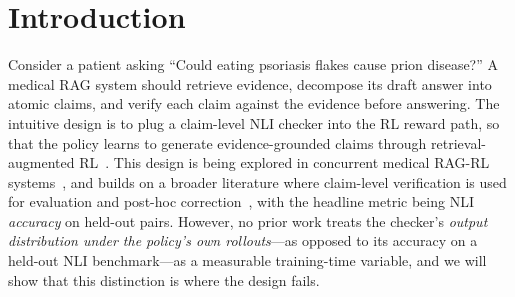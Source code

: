 \documentclass[11pt]{article}
\begin{document}
\section{Introduction}
\label{sec:intro}

Consider a patient asking ``Could eating psoriasis 
flakes cause prion disease?'' A medical RAG system 
should retrieve evidence, decompose its draft answer 
into atomic claims, and verify each claim against the 
evidence before answering. The intuitive design is to 
plug a claim-level NLI checker into the RL reward 
path, so that the policy learns to generate 
evidence-grounded claims through 
retrieval-augmented RL~\citep{jin2025search,xiong2024benchmarking,zhu2025selfimprovingmodelsteering}. 
This design is being explored in concurrent medical 
RAG-RL systems~\citep{evidencerl2025,xu2025beyond,song2026deep,article_chen,wang2026magesafeguardingllmagents,wang2025selfdestructivelanguagemodel,liu2026knowledgedrivenaugmentationretrievalintegrative,liu-etal-2025-examining}, 
and builds on a broader literature where claim-level 
verification is used for evaluation and post-hoc 
correction~\citep{min2023factscore,vladika2025atomic,vladika2025step}, 
with the headline metric being NLI \emph{accuracy} 
on held-out pairs.
However, no prior work treats the checker's 
\emph{output distribution under the policy's own 
rollouts}---as opposed to its accuracy on a 
held-out NLI benchmark---as a measurable 
training-time variable, and we will show that this 
distinction is where the design fails.
\end{document}
